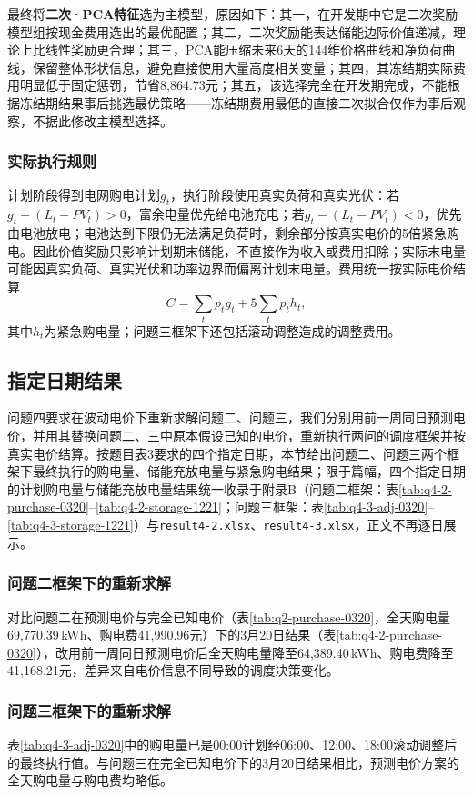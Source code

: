 最终将\textbf{二次·PCA特征}选为主模型，原因如下：其一，在开发期中它是二次奖励模型组按现金费用选出的最优配置；其二，二次奖励能表达储能边际价值递减，理论上比线性奖励更合理；其三，PCA能压缩未来6天的144维价格曲线和净负荷曲线，保留整体形状信息，避免直接使用大量高度相关变量；其四，其冻结期实际费用明显低于固定惩罚，节省8{,}864.73元；其五，该选择完全在开发期完成，不能根据冻结期结果事后挑选最优策略——冻结期费用最低的直接二次拟合仅作为事后观察，不据此修改主模型选择。

\subsubsection{实际执行规则}
\label{sec:q4-execution}
计划阶段得到电网购电计划$g_t$，执行阶段使用真实负荷和真实光伏：若$g_t-(L_t-PV_t)>0$，富余电量优先给电池充电；若$g_t-(L_t-PV_t)<0$，优先由电池放电；电池达到下限仍无法满足负荷时，剩余部分按真实电价的5倍紧急购电。因此价值奖励只影响计划期末储能，不直接作为收入或费用扣除；实际末电量可能因真实负荷、真实光伏和功率边界而偏离计划末电量。费用统一按实际电价结算
$$
C=\sum_tp_tg_t+5\sum_tp_th_t,
$$
其中$h_t$为紧急购电量；问题三框架下还包括滚动调整造成的调整费用。

\subsection{指定日期结果}
\label{sec:q4-specific-days}
问题四要求在波动电价下重新求解问题二、问题三，我们分别用前一周同日预测电价，并用其替换问题二、三中原本假设已知的电价，重新执行两问的调度框架并按真实电价结算。按题目表3要求的四个指定日期，本节给出问题二、问题三两个框架下最终执行的购电量、储能充放电量与紧急购电结果；限于篇幅，四个指定日期的计划购电量与储能充放电量结果统一收录于附录B（问题二框架：表\ref{tab:q4-2-purchase-0320}--\ref{tab:q4-2-storage-1221}；问题三框架：表\ref{tab:q4-3-adj-0320}--\ref{tab:q4-3-storage-1221}）与\texttt{result4-2.xlsx}、\texttt{result4-3.xlsx}，正文不再逐日展示。

\subsubsection{问题二框架下的重新求解}
对比问题二在预测电价与完全已知电价（表\ref{tab:q2-purchase-0320}，全天购电量69{,}770.39\,kWh、购电费41{,}990.96元）下的3月20日结果（表\ref{tab:q4-2-purchase-0320}），改用前一周同日预测电价后全天购电量降至64{,}389.40\,kWh、购电费降至41{,}168.21元，差异来自电价信息不同导致的调度决策变化。

\subsubsection{问题三框架下的重新求解}
表\ref{tab:q4-3-adj-0320}中的购电量已是00:00计划经06:00、12:00、18:00滚动调整后的最终执行值。与问题三在完全已知电价下的3月20日结果相比，预测电价方案的全天购电量与购电费均略低。

